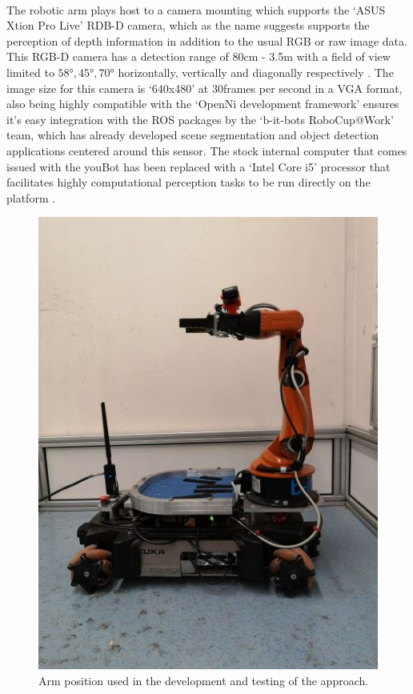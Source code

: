\paragraph{}The robotic arm plays host to a camera mounting which supports the `ASUS Xtion Pro Live' RDB-D camera, which as the name suggests supports the perception of depth information in addition to the usual RGB or raw image data. This RGB-D camera has a detection range of 80cm - 3.5m with a field of view limited to $\ang{58}, \ang{45}, \ang{70}$ horizontally, vertically and diagonally respectively \cite{swoboda2014comprehensive}. The image size for this camera is `640x480' at 30frames per second in a VGA format, also being highly compatible with the `OpenNi development framework' ensures it's easy integration with the ROS packages by the `b-it-bots RoboCup@Work' team, which has already developed scene segmentation and object detection applications centered around this sensor. The stock internal computer that comes issued with the youBot has been replaced with a `Intel Core i5' processor that facilitates highly computational perception tasks to be run directly on the platform \cite{Roscoe2012}. 

\begin{figure}[h]
	\centering
	\includegraphics[scale=0.5]{images/arm_config_l}
	\caption{Arm position used in the development and testing of the approach.}
	\label{fig:youbotarm}
\end{figure}

